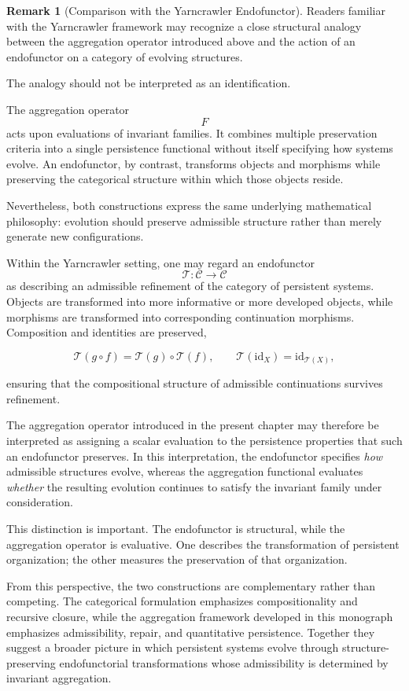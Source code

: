 \documentclass[11pt]{book}
\numberwithin{equation}{chapter}
\theoremstyle{definition}
\newtheorem{remark}[definition]{Remark}
\theoremstyle{plain}
\begin{document}
\begin{remark}[Comparison with the Yarncrawler Endofunctor]

Readers familiar with the Yarncrawler framework may recognize a close structural analogy between the aggregation operator introduced above and the action of an endofunctor on a category of evolving structures.

The analogy should not be interpreted as an identification.

The aggregation operator
\[
F
\]
acts upon evaluations of invariant families. It combines multiple preservation criteria into a single persistence functional without itself specifying how systems evolve. An endofunctor, by contrast, transforms objects and morphisms while preserving the categorical structure within which those objects reside.

Nevertheless, both constructions express the same underlying mathematical philosophy: evolution should preserve admissible structure rather than merely generate new configurations.

Within the Yarncrawler setting, one may regard an endofunctor
\[
\mathcal{T}:\mathcal{C}\rightarrow\mathcal{C}
\]
as describing an admissible refinement of the category of persistent systems. Objects are transformed into more informative or more developed objects, while morphisms are transformed into corresponding continuation morphisms. Composition and identities are preserved,

\[
\mathcal{T}(g\circ f)
=
\mathcal{T}(g)\circ\mathcal{T}(f),
\qquad
\mathcal{T}(\mathrm{id}_X)
=
\mathrm{id}_{\mathcal{T}(X)},
\]

ensuring that the compositional structure of admissible continuations survives refinement.

The aggregation operator introduced in the present chapter may therefore be interpreted as assigning a scalar evaluation to the persistence properties that such an endofunctor preserves. In this interpretation, the endofunctor specifies \emph{how} admissible structures evolve, whereas the aggregation functional evaluates \emph{whether} the resulting evolution continues to satisfy the invariant family under consideration.

This distinction is important. The endofunctor is structural, while the aggregation operator is evaluative. One describes the transformation of persistent organization; the other measures the preservation of that organization.

From this perspective, the two constructions are complementary rather than competing. The categorical formulation emphasizes compositionality and recursive closure, while the aggregation framework developed in this monograph emphasizes admissibility, repair, and quantitative persistence. Together they suggest a broader picture in which persistent systems evolve through structure-preserving endofunctorial transformations whose admissibility is determined by invariant aggregation.


\end{remark}
\end{document}
